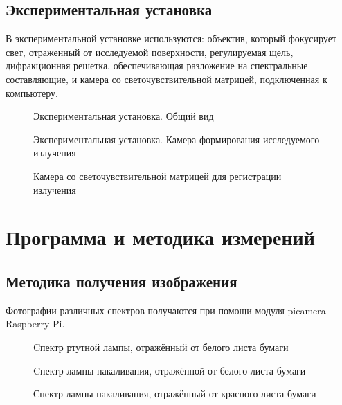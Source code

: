 \documentclass[a4paper,12pt]{article} %
\begin{document}
    \subsection{Экспериментальная установка}
    В экспериментальной установке используются: объектив, который фокусирует свет, отраженный от исследуемой поверхности, регулируемая щель, дифракционная решетка, обеспечивающая разложение на спектральные составляющие, и камера со светочувствительной матрицей, подключенная к компьютеру.
    \vspace{1cm}
  \begin{figure}[h]
                \caption{Экспериментальная установка. Общий вид}
\end{figure}

  \begin{figure}[h]
                \caption{Экспериментальная установка. Камера формирования исследуемого излучения}
\end{figure}

  \begin{figure}[h]
                \caption{Камера со светочувствительной матрицей для регистрации излучения}
\end{figure}
\newpage\section{Программа и методика измерений}

\subsection{Методика получения изображения}
Фотографии различных спектров получаются при помощи модуля picamera Raspberry Pi.
 
\begin{figure}[h]
                \caption{Cпектр ртутной лампы, отражённый от белого листа бумаги}
\end{figure}

\begin{figure}[h]
                \caption{Cпектр лампы накаливания, отражённой от белого листа бумаги}
\end{figure}

\begin{figure}[h]
                \caption{Спектр лампы накаливания, отражённый от красного листа бумаги}
\end{figure}
\end{document}
